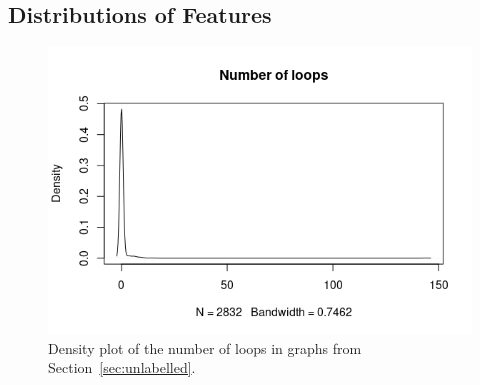 \documentclass{l4proj}
\theoremstyle{definition}
\theoremstyle{remark}
\begin{document}
\subsection{Distributions of Features}

\begin{figure}
  \centering
  \includegraphics[scale=0.7]{images/sip_loops.png}
  \caption{Density plot of the number of loops in graphs from
    Section~\ref{sec:unlabelled}.}
  \label{fig:loops}
\end{figure}
\end{document}

